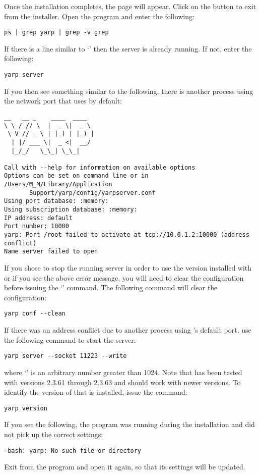 \condPage{}
Once the installation completes, the  page will appear.
Click on the  button to exit from the installer.
\condPage{}
\tertiaryEnd{}
Open the  program and enter the following:
\outputBegin{}
\begin{verbatim}
ps | grep yarp | grep -v grep
\end{verbatim}
\outputEnd{}
If there is a line similar to `'
then the \yarp{} server is already running. If not, enter the following:
\outputBegin{}
\begin{verbatim}
yarp server
\end{verbatim}
\outputEnd{}
If you then see something similar to the following, there is another process using the
network port that \yarp{} uses by default:
\outputBegin{}
\begin{verbatim}
__   __ _    ____  ____  
\ \ / // \  |  _ \|  _ \ 
 \ V // _ \ | |_) | |_) |
  | |/ ___ \|  _ <|  __/ 
  |_/_/   \_\_| \_\_|    

Call with --help for information on available options
Options can be set on command line or in /Users/M_M/Library/Application
       Support/yarp/config/yarpserver.conf
Using port database: :memory:
Using subscription database: :memory:
IP address: default
Port number: 10000
yarp: Port /root failed to activate at tcp://10.0.1.2:10000 (address conflict)
Name server failed to open
\end{verbatim}
\outputEnd{}
If you chose to stop the running \yarp{} server in order to use the version installed with
\mplusm{} or if you see the above error message, you will need to clear the \yarp{}
configuration before issuing the `\asCode{yarp~server}' command.
The following command will clear the \yarp{} configuration:
\outputBegin{}
\begin{verbatim}
yarp conf --clean
\end{verbatim}
\outputEnd{}
If there was an address conflict due to another process using \yarp's default port, use
the following command to start the \yarp{} server:
\outputBegin{}
\begin{verbatim}
yarp server --socket 11223 --write
\end{verbatim}
\outputEnd{}
where `' is an arbitrary number greater than 1024.
Note that \mplusm{} has been tested with \yarp{} versions 2.3.61 through 2.3.63 and should
work with newer versions.
To identify the version of \yarp{} that is installed, issue the command:
\outputBegin{}
\begin{verbatim}
yarp version
\end{verbatim}
\outputEnd{}
If you see the following, the  program was running during the
installation and did not pick up the correct settings:
\outputBegin{}
\begin{verbatim}
-bash: yarp: No such file or directory
\end{verbatim}
\outputEnd{}
Exit from the  program and open it again, so that its settings will be
updated.\\

